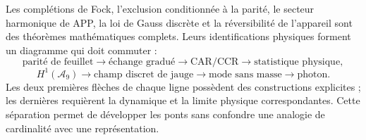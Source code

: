 Les complétions de Fock, l’exclusion conditionnée à la parité, le secteur
harmonique de APP, la loi de Gauss discrète et la réversibilité de l’appareil sont des théorèmes
mathématiques complets. Leurs identifications physiques forment un diagramme qui
doit commuter :
\[
 \text{parité de feuillet}
 \longrightarrow\text{échange gradué}
 \longrightarrow\text{CAR/CCR}
 \longrightarrow\text{statistique physique},
\]
\[
 H^1(\mathcal A_9)
 \longrightarrow\text{champ discret de jauge}
 \longrightarrow\text{mode sans masse}
 \longrightarrow\text{photon}.
\]
Les deux premières flèches de chaque ligne possèdent des constructions explicites ; les
dernières requièrent la dynamique et la limite physique correspondantes. Cette
séparation permet de développer les ponts sans confondre une analogie de
cardinalité avec une représentation.
